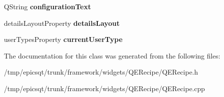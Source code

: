 \begin{DoxyCompactItemize}
\item 
\hypertarget{classQERecipe_ae6094f6200f239fa985365bfa318c0ca}{
QString {\bfseries configurationText}}
\label{classQERecipe_ae6094f6200f239fa985365bfa318c0ca}

\item 
\hypertarget{classQERecipe_a2c8815f7325dd0225157765c8ba8f65e}{
detailsLayoutProperty {\bfseries detailsLayout}}
\label{classQERecipe_a2c8815f7325dd0225157765c8ba8f65e}

\item 
\hypertarget{classQERecipe_aa82c54fd4ae28bf35dc5a9e25a7611fb}{
userTypesProperty {\bfseries currentUserType}}
\label{classQERecipe_aa82c54fd4ae28bf35dc5a9e25a7611fb}

\end{DoxyCompactItemize}


The documentation for this class was generated from the following files:\begin{DoxyCompactItemize}
\item 
/tmp/epicsqt/trunk/framework/widgets/QERecipe/QERecipe.h\item 
/tmp/epicsqt/trunk/framework/widgets/QERecipe/QERecipe.cpp\end{DoxyCompactItemize}
